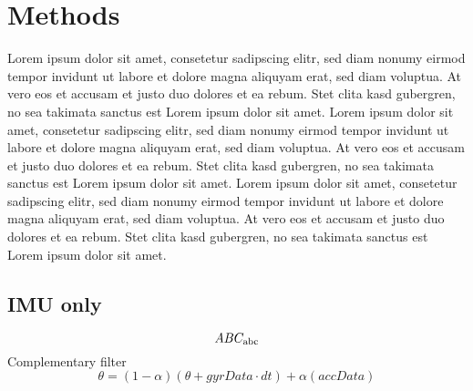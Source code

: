 \chapter{Methods}
\label{ch:Methods}
Lorem ipsum dolor sit amet, consetetur sadipscing elitr, sed diam nonumy eirmod tempor invidunt ut labore et dolore magna aliquyam erat, sed diam voluptua.
At vero eos et accusam et justo duo dolores et ea rebum. Stet clita kasd gubergren, no sea takimata sanctus est Lorem ipsum dolor sit amet.
Lorem ipsum dolor sit amet, consetetur sadipscing elitr, sed diam nonumy eirmod tempor invidunt ut labore et dolore magna aliquyam erat, sed diam voluptua.
At vero eos et accusam et justo duo dolores et ea rebum. Stet clita kasd gubergren, no sea takimata sanctus est Lorem ipsum dolor sit amet.
Lorem ipsum dolor sit amet, consetetur sadipscing elitr, sed diam nonumy eirmod tempor invidunt ut labore et dolore magna aliquyam erat, sed diam voluptua.
At vero eos et accusam et justo duo dolores et ea rebum. Stet clita kasd gubergren, no sea takimata sanctus est Lorem ipsum dolor sit amet.

\section{IMU only}
\begin{equation}
	ABC_\mathrm{abc}
\end{equation}
Complementary filter
\begin{equation}
	\theta = (1-\alpha)(\theta + gyrData\cdot dt) + \alpha(accData)
\end{equation}

